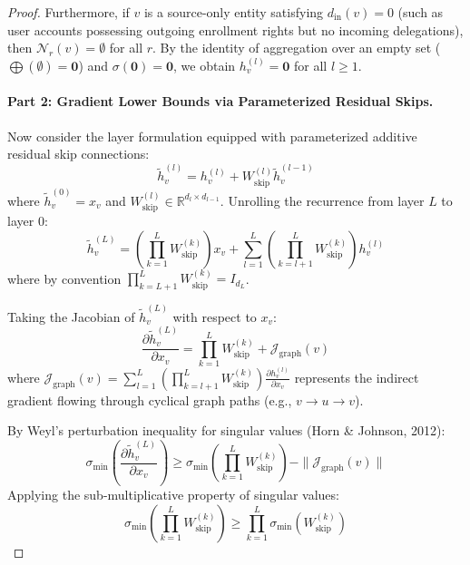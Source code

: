 \begin{proof}
Furthermore, if $v$ is a source-only entity satisfying $d_{\text{in}}(v) = 0$ (such as user accounts possessing outgoing enrollment rights but no incoming delegations), then $\mathcal{N}_r(v) = \emptyset$ for all $r$. By the identity of aggregation over an empty set ($\bigoplus(\emptyset) = \mathbf{0}$) and $\sigma(\mathbf{0}) = \mathbf{0}$, we obtain $h_v^{(l)} = \mathbf{0}$ for all $l \ge 1$.

\paragraph{Part 2: Gradient Lower Bounds via Parameterized Residual Skips.}
Now consider the layer formulation equipped with parameterized additive residual skip connections:
\begin{equation}
\tilde{h}_v^{(l)} = h_v^{(l)} + W_{\text{skip}}^{(l)} \tilde{h}_v^{(l-1)}
\end{equation}
where $\tilde{h}_v^{(0)} = x_v$ and $W_{\text{skip}}^{(l)} \in \mathbb{R}^{d_l \times d_{l-1}}$. Unrolling the recurrence from layer $L$ to layer $0$:
\begin{equation}
\tilde{h}_v^{(L)} = \left( \prod_{k=1}^L W_{\text{skip}}^{(k)} \right) x_v + \sum_{l=1}^L \left( \prod_{k=l+1}^L W_{\text{skip}}^{(k)} \right) h_v^{(l)}
\end{equation}
where by convention $\prod_{k=L+1}^L W_{\text{skip}}^{(k)} = I_{d_L}$. 

Taking the Jacobian of $\tilde{h}_v^{(L)}$ with respect to $x_v$:
\begin{equation}
\frac{\partial \tilde{h}_v^{(L)}}{\partial x_v} = \prod_{k=1}^L W_{\text{skip}}^{(k)} + \mathcal{J}_{\text{graph}}(v)
\end{equation}
where $\mathcal{J}_{\text{graph}}(v) = \sum_{l=1}^L \left( \prod_{k=l+1}^L W_{\text{skip}}^{(k)} \right) \frac{\partial h_v^{(l)}}{\partial x_v}$ represents the indirect gradient flowing through cyclical graph paths (e.g., $v \to u \to v$).

By Weyl's perturbation inequality for singular values (Horn \& Johnson, 2012):
\begin{equation}
\sigma_{\min} \left( \frac{\partial \tilde{h}_v^{(L)}}{\partial x_v} \right) \ge \sigma_{\min} \left( \prod_{k=1}^L W_{\text{skip}}^{(k)} \right) - \|\mathcal{J}_{\text{graph}}(v)\|
\end{equation}
Applying the sub-multiplicative property of singular values:
\begin{equation}
\sigma_{\min} \left( \prod_{k=1}^L W_{\text{skip}}^{(k)} \right) \ge \prod_{k=1}^L \sigma_{\min}(W_{\text{skip}}^{(k)})
\end{equation}


\end{proof}
